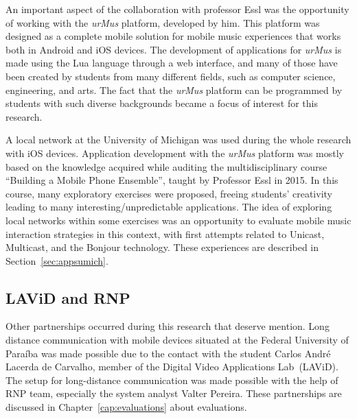 An important aspect of the collaboration with professor Essl was the opportunity of working with the \textit{urMus} platform, developed by him.
This platform was designed as a complete mobile solution for mobile music experiences that works both in Android and iOS devices.
The development of applications for \textit{urMus} is made using the Lua language through a web interface, and many of those have been created by students from many different fields, such as computer science, engineering, and arts. The fact that the \textit{urMus} platform can be programmed by students with such diverse backgrounds became a focus of interest for this research. 
%


A local network at the University of Michigan was used during the whole research with iOS devices.
Application development with the \textit{urMus} platform was mostly based on the knowledge acquired while auditing the multidisciplinary course ``Building a Mobile Phone Ensemble'', taught by Professor Essl in 2015.
In this course, many exploratory exercises were proposed, freeing students' creativity leading to many interesting/unpredictable applications.
The idea of exploring local networks within some exercises was an opportunity to evaluate mobile music interaction strategies in this context, with first attempts related to Unicast, Multicast, and the Bonjour technology.
These experiences are described in Section~\ref{sec:appsumich}. 

\subsection*{LAViD and RNP}

Other partnerships occurred during this research that deserve mention.
Long distance communication with mobile devices situated at the Federal University of Paraíba was made possible due to the contact with the student Carlos André Lacerda de Carvalho, member of the Digital Video Applications Lab~(LAViD).
The setup for long-distance communication was made possible with the help of RNP team, especially the system analyst Valter Pereira.
These partnerships are discussed in Chapter~\ref{cap:evaluations} about evaluations.